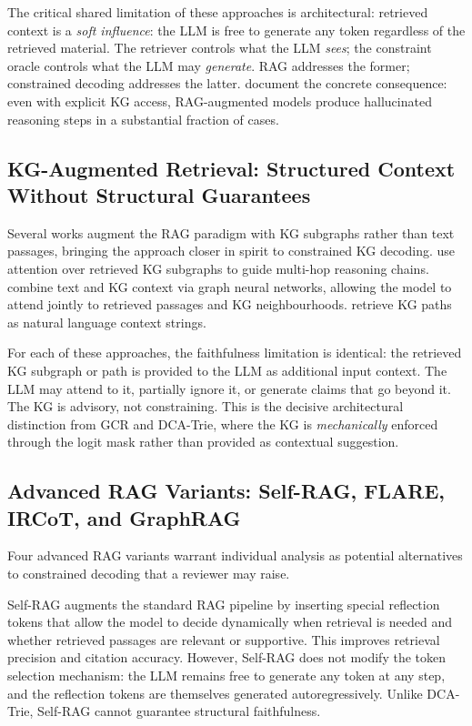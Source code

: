 The critical shared limitation of these approaches is architectural: retrieved
context is a \textit{soft influence}: the LLM is free to generate any token
regardless of the retrieved material. The retriever controls what the LLM
\textit{sees}; the constraint oracle controls what the LLM may
\textit{generate}. RAG addresses the former; constrained decoding addresses the
latter. \citet{agrawal2024mindful} document the concrete consequence: even with
explicit KG access, RAG-augmented models produce hallucinated reasoning steps in
a substantial fraction of cases.

\subsection{KG-Augmented Retrieval: Structured Context Without Structural
    Guarantees}

Several works augment the RAG paradigm with KG subgraphs rather than text
passages, bringing the approach closer in spirit to constrained KG decoding.
\citet{he2021multihop} use attention over retrieved KG subgraphs to guide
multi-hop reasoning chains. \citet{yasunaga2021qagnn} combine text and KG
context via graph neural networks, allowing the model to attend jointly to
retrieved passages and KG neighbourhoods. \citet{shi2021kgpath} retrieve KG
paths as natural language context strings.

For each of these approaches, the faithfulness limitation is identical: the
retrieved KG subgraph or path is provided to the LLM as additional input
context. The LLM may attend to it, partially ignore it, or generate claims that
go beyond it. The KG is advisory, not constraining. This is the decisive
architectural distinction from GCR and DCA-Trie, where the KG is
\textit{mechanically} enforced through the logit mask rather than provided as
contextual suggestion.

\subsection{Advanced RAG Variants: Self-RAG, FLARE, IRCoT, and GraphRAG}

Four advanced RAG variants warrant individual analysis as potential alternatives
to constrained decoding that a reviewer may raise.

Self-RAG \citep{asai2024selfrag} augments the standard RAG pipeline by inserting
special reflection tokens that allow the model to decide dynamically when
retrieval is needed and whether retrieved passages are relevant or supportive.
This improves retrieval precision and citation accuracy. However, Self-RAG does
not modify the token selection mechanism: the LLM remains free to generate any
token at any step, and the reflection tokens are themselves generated
autoregressively. Unlike DCA-Trie, Self-RAG cannot guarantee structural
faithfulness.

